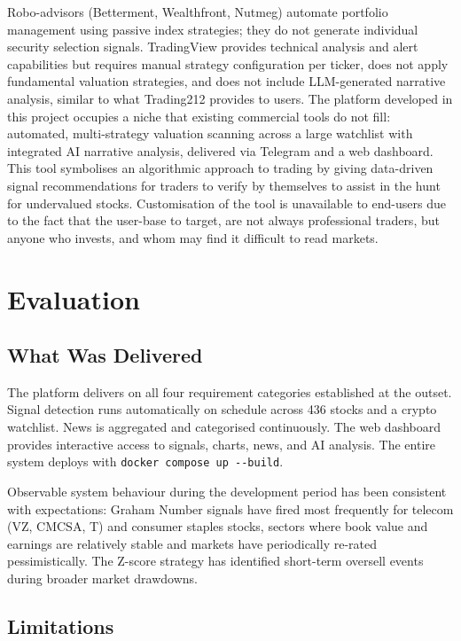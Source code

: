 \documentclass[12pt,a4paper]{article}
\begin{document}
Robo-advisors (Betterment, Wealthfront, Nutmeg) automate portfolio management using passive index strategies; they do not generate individual security selection signals. TradingView provides technical analysis and alert capabilities but requires manual strategy configuration per ticker, does not apply fundamental valuation strategies, and does not include LLM-generated narrative analysis, similar to what Trading212 provides to users. The platform developed in this project occupies a niche that existing commercial tools do not fill: automated, multi-strategy valuation scanning across a large watchlist with integrated AI narrative analysis, delivered via Telegram and a web dashboard. This tool symbolises an algorithmic approach to trading by giving data-driven signal recommendations for traders to verify by themselves to assist in the hunt for undervalued stocks. Customisation of the tool is unavailable to end-users due to the fact that the user-base to target, are not always professional traders, but anyone who invests, and whom may find it difficult to read markets.

\section{Evaluation}

\subsection{What Was Delivered}

The platform delivers on all four requirement categories established at the outset. Signal detection runs automatically on schedule across 436 stocks and a crypto watchlist. News is aggregated and categorised continuously. The web dashboard provides interactive access to signals, charts, news, and AI analysis. The entire system deploys with \texttt{docker compose up -{}-build}.

Observable system behaviour during the development period has been consistent with expectations: Graham Number signals have fired most frequently for telecom (VZ, CMCSA, T) and consumer staples stocks, sectors where book value and earnings are relatively stable and markets have periodically re-rated pessimistically. The Z-score strategy has identified short-term oversell events during broader market drawdowns.

\subsection{Limitations}
\end{document}
